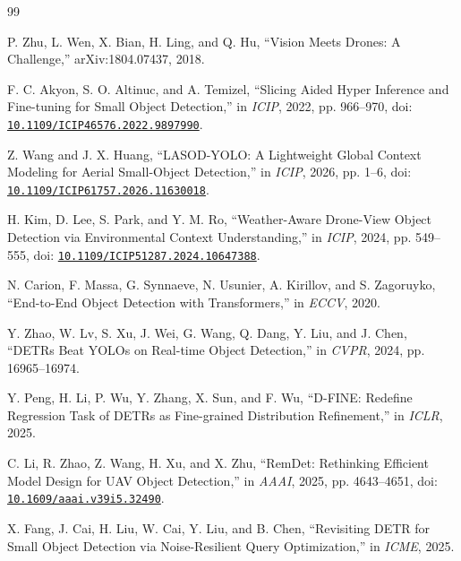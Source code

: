 \clearpage
\begin{thebibliography}{99}
\fontsize{9}{11.4}\selectfont\setlength{\itemsep}{2.5pt}\setlength{\parsep}{0pt}

 P. Zhu, L. Wen, X. Bian, H. Ling, and Q. Hu, ``Vision Meets Drones: A Challenge,'' arXiv:1804.07437, 2018.

 F. C. Akyon, S. O. Altinuc, and A. Temizel, ``Slicing Aided Hyper Inference and Fine-tuning for Small Object Detection,'' in \emph{ICIP}, 2022, pp. 966--970, doi: \href{https://doi.org/10.1109/ICIP46576.2022.9897990}{\nolinkurl{10.1109/ICIP46576.2022.9897990}}.

 Z. Wang and J. X. Huang, ``LASOD-YOLO: A Lightweight Global Context Modeling for Aerial Small-Object Detection,'' in \emph{ICIP}, 2026, pp. 1--6, doi: \href{https://doi.org/10.1109/ICIP61757.2026.11630018}{\nolinkurl{10.1109/ICIP61757.2026.11630018}}.

 H. Kim, D. Lee, S. Park, and Y. M. Ro, ``Weather-Aware Drone-View Object Detection via Environmental Context Understanding,'' in \emph{ICIP}, 2024, pp. 549--555, doi: \href{https://doi.org/10.1109/ICIP51287.2024.10647388}{\nolinkurl{10.1109/ICIP51287.2024.10647388}}.

 N. Carion, F. Massa, G. Synnaeve, N. Usunier, A. Kirillov, and S. Zagoruyko, ``End-to-End Object Detection with Transformers,'' in \emph{ECCV}, 2020.

 Y. Zhao, W. Lv, S. Xu, J. Wei, G. Wang, Q. Dang, Y. Liu, and J. Chen, ``DETRs Beat YOLOs on Real-time Object Detection,'' in \emph{CVPR}, 2024, pp. 16965--16974.

 Y. Peng, H. Li, P. Wu, Y. Zhang, X. Sun, and F. Wu, ``D-FINE: Redefine Regression Task of DETRs as Fine-grained Distribution Refinement,'' in \emph{ICLR}, 2025.

 C. Li, R. Zhao, Z. Wang, H. Xu, and X. Zhu, ``RemDet: Rethinking Efficient Model Design for UAV Object Detection,'' in \emph{AAAI}, 2025, pp. 4643--4651, doi: \href{https://doi.org/10.1609/aaai.v39i5.32490}{\nolinkurl{10.1609/aaai.v39i5.32490}}.

\newpage

 X. Fang, J. Cai, H. Liu, W. Cai, Y. Liu, and B. Chen, ``Revisiting DETR for Small Object Detection via Noise-Resilient Query Optimization,'' in \emph{ICME}, 2025.


\end{thebibliography}
